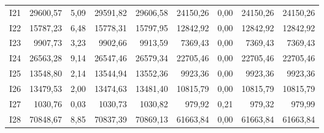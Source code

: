 \begin{tabular}{lrrrrrrrr}
I21 & 29600,57 & 5,09 & 29591,82 & 29606,58 & 24150,26 & 0,00 & 24150,26 & 24150,26 \\
I22 & 15787,23 & 6,48 & 15778,31 & 15797,95 & 12842,92 & 0,00 & 12842,92 & 12842,92 \\
I23 & 9907,73 & 3,23 & 9902,66 & 9913,59 & 7369,43 & 0,00 & 7369,43 & 7369,43 \\
I24 & 26563,28 & 9,14 & 26547,46 & 26579,34 & 22705,46 & 0,00 & 22705,46 & 22705,46 \\
I25 & 13548,80 & 2,14 & 13544,94 & 13552,36 & 9923,36 & 0,00 & 9923,36 & 9923,36 \\
I26 & 13479,53 & 2,00 & 13474,63 & 13481,40 & 10815,79 & 0,00 & 10815,79 & 10815,79 \\
I27 & 1030,76 & 0,03 & 1030,73 & 1030,82 & 979,92 & 0,21 & 979,32 & 979,99 \\
I28 & 70848,67 & 8,85 & 70837,39 & 70869,13 & 61663,84 & 0,00 & 61663,84 & 61663,84 \\
\hline
\end{tabular}
